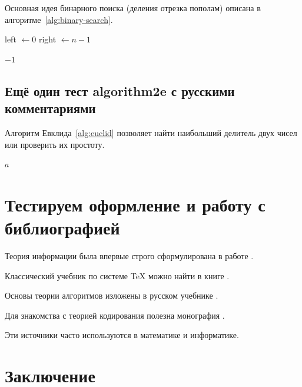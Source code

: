 \documentclass[12pt]{extarticle}
\begin{document}
Основная идея бинарного поиска (деления отрезка пополам) описана в алгоритме~\ref{alg:binary-search}.

\begin{algorithm}[H]

left $\gets 0$\;
right $\gets n - 1$\;


\KwRet $-1$\;
\caption{\label{alg:binary-search}Бинарный поиск}
\end{algorithm}
\subsection{Ещё один тест algorithm2e с русскими комментариями}
\label{sec:orgf21fb3c}

Алгоритм Евклида~\ref{alg:euclid} позволяет найти наибольший делитель двух чисел или проверить их простоту.

\begin{algorithm}[H]

\KwRet $a$\;
\caption{\label{alg:euclid}Алгоритм Евклида}
\end{algorithm}
\section{Тестируем оформление и работу с библиографией}
\label{sec:org06ba887}

Теория информации была впервые строго сформулирована в работе
\autocite{Shannon1948}.

Классический учебник по системе \TeX{} можно найти в книге \autocite{Knuth1984}.

Основы теории алгоритмов изложены в русском учебнике \autocite{aho1979}.

Для знакомства с теорией кодирования полезна монография \autocite{macwilliams1979}.

Эти источники часто используются в математике и информатике.
\section*{Заключение}
\label{sec:org2d66b38}
\end{document}
